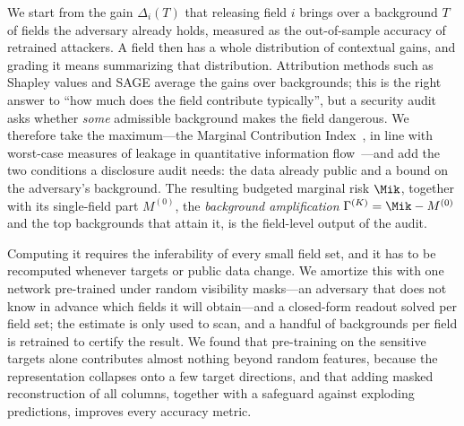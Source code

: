 We start from the gain $\Delta_i(T)$ that releasing field $i$ brings over a background $T$ of fields
the adversary already holds, measured as the out-of-sample accuracy of retrained attackers. A field
then has a whole distribution of contextual gains, and grading it means summarizing that
distribution. Attribution methods such as Shapley values and SAGE average the gains over backgrounds;
this is the right answer to ``how much does the field contribute typically'', but a security audit
asks whether \emph{some} admissible background makes the field dangerous. We therefore take the
maximum---the Marginal Contribution Index~\cite{catav2021mci}, in line with worst-case measures of
leakage in quantitative information flow~\cite{smith2009qif,alvim2012gleakage}---and add the two
conditions a disclosure audit needs: the data already public and a bound on the adversary's
background. The resulting budgeted marginal risk $\Mik$, together with its single-field part
$M^{(0)}$, the \emph{background amplification} $\Gamma^{(K)}=\Mik-M^{(0)}$ and the top backgrounds
that attain it, is the field-level output of the audit.

Computing it requires the inferability of every small field set, and it has to be recomputed
whenever targets or public data change. We amortize this with one network pre-trained under random
visibility masks---an adversary that does not know in advance which fields it will obtain---and a
closed-form readout solved per field set; the estimate is only used to scan, and a handful of
backgrounds per field is retrained to certify the result. We found that pre-training on the
sensitive targets alone contributes almost nothing beyond random features, because the representation
collapses onto a few target directions, and that adding masked reconstruction of all columns,
together with a safeguard against exploding predictions, improves every accuracy metric.


